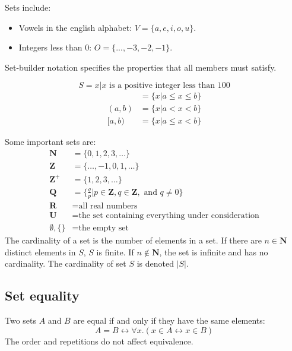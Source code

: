 \begin{example}
    Sets include:
    \begin{itemize}
        \item Vowels in the english alphabet: \(V = \{a, e, i, o, u\}\).
        \item Integers less than \(0\): \(O = \{..., -3, -2, -1\}\).
    \end{itemize}
\end{example}
Set-builder notation specifies the properties that all members must satisfy.
\begin{example}
    \begin{equation*}
        S = {x | x \text{ is a positive integer less than } 100}
    \end{equation*}
    \begin{align*}
        [a, b] & = \{x | a \leq x \leq b\} \\
        (a, b) & =\{x | a < x < b\}        \\
        [a, b) & =\{x | a \leq x < b\}
    \end{align*}
\end{example}
Some important sets are:
\begin{align*}
    \mathbf{N}      & = \{0, 1, 2, 3, \dots\}                                                       \\
    \mathbf{Z}      & = \{\dots, -1, 0, 1, \dots\}                                                  \\
    \mathbf{Z^+}    & = \{1, 2, 3, \dots\}                                                          \\
    \mathbf{Q}      & = \{\frac{q}{p} | p \in \mathbf{Z}, q \in \mathbf{Z}, \text{ and } q \ne 0 \} \\
    \mathbf{R}      & = \text{all real numbers}                                                     \\
    \mathbf{U}      & = \text{the set containing everything under consideration}                    \\
    \emptyset, \{\} & = \text{the empty set}
\end{align*}
The cardinality of a set is the number of elements in a set. If there are \(n \in \mathbf{N}\) distinct elements in \(S\), \(S\) is finite. If \(n \notin \mathbf{N}\), the set is infinite and has no cardinality. The cardinality of set \(S\) is denoted \(|S|\).

\subsection{Set equality}
Two sets \(A\) and \(B\) are equal if and only if they have the same elements:
\begin{equation}
    \label{eq:set_equivalence}
    A = B \leftrightarrow \forall x. (x \in A \leftrightarrow x \in B)
\end{equation}
The order and repetitions do not affect equivalence.

